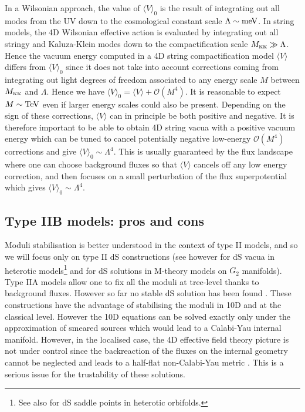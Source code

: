 \documentclass[11pt,a4paper]{article}
\def\KK{{\scriptscriptstyle \rm KK}}
\newcommand{\mc}{\mathcal}
\begin{document}
In a Wilsonian approach, the value of $\langle V\rangle_0$ is the result of integrating out all modes from the UV down to the cosmological constant scale $\Lambda\sim {\rm meV}$. In string models, the 4D Wilsonian effective action is evaluated by integrating out all stringy and Kaluza-Klein modes down to the compactification scale $M_\KK \gg \Lambda$. Hence the vacuum energy computed in a 4D string compactification model $\langle V\rangle$ differs from $\langle V\rangle_0$ since it does not take into account corrections coming from integrating out light degrees of freedom associated to any energy scale $M$ between $M_\KK$ and $\Lambda$. Hence we have $\langle V\rangle_0 = \langle V\rangle + \mc{O}(M^4)$. It is reasonable to expect $M\sim {\rm TeV}$ even if larger energy scales could also be present. Depending on the sign of these corrections, $\langle V\rangle$ can in principle be both positive and negative. It is therefore important to be able to obtain 4D string vacua with a positive vacuum energy which can be tuned to cancel potentially negative low-energy $\mc{O}(M^4)$ corrections and give $\langle V\rangle_0 \sim \Lambda^4$. This is usually guaranteed by the flux landscape where one can choose background fluxes so that $\langle V\rangle$ cancels off any low energy correction, and then focuses on a small perturbation of the flux superpotential which gives $\langle V\rangle_0 \sim \Lambda^4$.


\subsection{Type IIB models: pros and cons}
\label{sec:ProsCons}

Moduli stabilisation is better understood in the context of type II models, and so we will focus only on type II dS constructions (see however \cite{Cicoli:2013rwa} for dS vacua in heterotic models\footnote{See also
\cite{Parameswaran:2010ec} for dS saddle points in heterotic
orbifolds.} and \cite{Acharya:2008zi} for dS solutions in M-theory models on $G_2$ manifolds). Type IIA models allow one to fix all the moduli at tree-level thanks to background fluxes. However so far no stable dS solution has been found \cite{Caviezel:2008tf, Flauger:2008ad, Danielsson:2009ff, Caviezel:2009tu, Danielsson:2010bc, Danielsson:2011au, Andriot:2018ept}. These constructions have the advantage of stabilising the moduli in 10D and at the classical level. However the 10D equations can be solved exactly only under the approximation of smeared sources which would lead to a Calabi-Yau internal manifold. However, in the localised case, the 4D effective field theory picture is not under control since the backreaction of the fluxes on the internal geometry cannot be neglected and leads to a half-flat non-Calabi-Yau metric \cite{Acharya:2006ne, McOrist:2012yc}. This is a serious issue for the trustability of these solutions.
\end{document}
